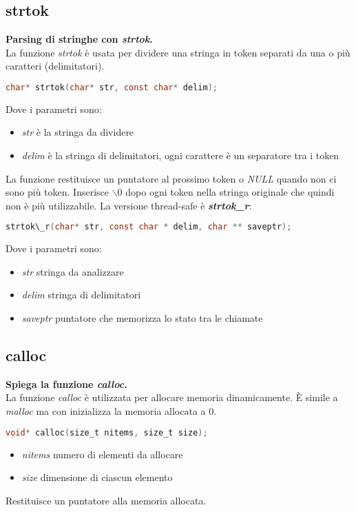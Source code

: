 \subsection{strtok}
\textbf{Parsing di stringhe con \textit{strtok}.}\\
La funzione \textit{strtok} è usata per dividere una stringa in token separati da una o più caratteri (delimitatori).
\begin{lstlisting}[language=C]
	char* strtok(char* str, const char* delim);
\end{lstlisting}
Dove i parametri sono:
\begin{itemize}
	\item \textit{str} è la stringa da dividere
	\item \textit{delim} è la stringa di delimitatori, ogni carattere è un separatore tra i token
\end{itemize}
La funzione restituisce un puntatore al prossimo token o \textit{NULL} quando non ci sono più token. Inserisce $\backslash 0$ dopo ogni token nella stringa originale che quindi non è più utilizzabile.
\newpage
\noindent La versione thread-safe è \textbf{\textit{strtok\_r}}:
\begin{lstlisting}[language=C]
	strtok\_r(char* str, const char * delim, char ** saveptr);
\end{lstlisting}
Dove i parametri sono:
\begin{itemize}
	\item \textit{str} stringa da analizzare
	\item \textit{delim} stringa di delimitatori
	\item \textit{saveptr} puntatore che memorizza lo stato tra le chiamate
\end{itemize}
\subsection{calloc}
\textbf{Spiega la funzione \textit{calloc}.}\\
La funzione \textit{calloc} è utilizzata per allocare memoria dinamicamente. È simile a \textit{malloc} ma con inizializza la memoria allocata a $0$.
\begin{lstlisting}[language=C]
	void* calloc(size_t nitems, size_t size);
\end{lstlisting}
\begin{itemize}
	\item \textit{nitems} numero di elementi da allocare
	\item \textit{size} dimensione di ciascun elemento
\end{itemize}
Restituisce un puntatore alla memoria allocata.

